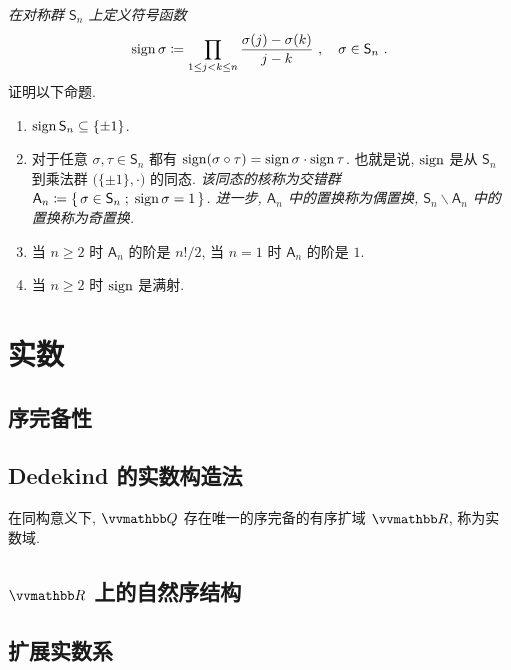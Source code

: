 \begin{exercise}\label{ex:sign-on-symmetric-group}
    \textsl{在对称群 \(\mathsf S_n\) 上定义符号函数
    \[
        \sign \sigma \coloneqq \prod_{1 \leq j < k \leq n} \frac{\sigma(j) - \sigma(k)}{j - k}\ ,\quad \sigma \in \mathsf S_n\ .
    \]
    } 证明以下命题.
    \begin{enumerate}
        \item \(\operatorname{sign} \mathsf S_n \subseteq \{\pm 1\}\).
        \item 对于任意 \(\sigma, \tau \in \mathsf S_n\) 都有 \(\operatorname{sign} (\sigma \circ \tau) = \operatorname{sign} \sigma \cdot \operatorname{sign} \tau\). 也就是说, \(\operatorname{sign}\) 是从 \(\mathsf S_n\) 到乘法群 \(\bigl(\{\pm 1\}, \cdot\bigr)\) 的同态. \textsl{该同态的核称为交错群 \(\mathsf A_n \coloneqq \{\, \sigma \in \mathsf S_n \;;\; \operatorname{sign} \sigma = 1 \,\}\). 进一步, \(\mathsf A_n\) 中的置换称为偶置换, \(\mathsf S_n \backslash \mathsf A_n\) 中的置换称为奇置换.}
        \item 当 \(n \geq 2\) 时 \(\mathsf A_n\) 的阶是 \(n! / 2\), 当 \(n = 1\) 时 \(\mathsf A_n\) 的阶是 \(1\).
        \item 当 \(n \geq 2\) 时 \(\operatorname{sign}\) 是满射.
    \end{enumerate}
\end{exercise}

\newpage

\section{实数}

\subsection{序完备性}

\subsection{Dedekind 的实数构造法}

\begin{theorem}\label{thm:uniqueness-of-order-complete-extension-of-Q}
    在同构意义下, \(\Q\) 存在唯一的序完备的有序扩域 \(\R\), 称为实数域.
\end{theorem}

\subsection{\(\R\) 上的自然序结构}

\subsection{扩展实数系}

